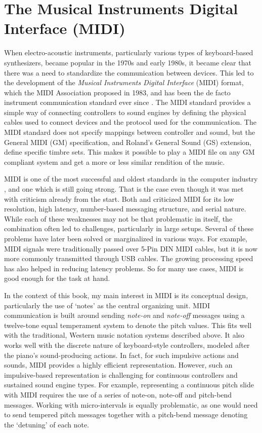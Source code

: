 \section{The Musical Instruments Digital Interface (MIDI)}\label{sect:midi}

When electro-acoustic instruments, particularly various types of keyboard-based synthesizers, became popular in the 1970s and early 1980s, it became clear that there was a need to standardize the communication between devices. This led to the development of the \emph{Musical Instruments Digital Interface} (MIDI) format, which the MIDI Association proposed in 1983, and has been the de facto instrument communication standard ever since \citep{jungleib_general_1996}. The MIDI standard provides a simple way of connecting controllers to sound engines by defining the physical cables used to connect devices and the protocol used for the communication. The MIDI standard does not specify mappings between controller and sound, but the General MIDI (GM) specification, and Roland's General Sound (GS) extension, define specific timbre sets. This makes it possible to play a MIDI file on any GM compliant system and get a more or less similar rendition of the music.

MIDI is one of the most successful and oldest standards in the computer industry \citep{rothstein_midi_1992}, and one which is still going strong. That is the case even though it was met with criticism already from the start. Both \citet{loy_musicians_1985} and \citet{moore_dysfunctions_1988} criticized MIDI for its low resolution, high latency, number-based messaging structure, and serial nature. While each of these weaknesses may not be that problematic in itself, the combination often led to challenges, particularly in large setups. Several of these problems have later been solved or marginalized in various ways. For example, MIDI signals were traditionally passed over 5-Pin DIN MIDI cables, but it is now more commonly transmitted through USB cables. The growing processing speed has also helped in reducing latency problems. So for many use cases, MIDI is good enough for the task at hand.

In the context of this book, my main interest in MIDI is its conceptual design, particularly the use of `notes' as the central organizing unit. MIDI communication is built around sending \emph{note-on} and \emph{note-off} messages using a twelve-tone equal temperament system to denote the pitch values. This fits well with the traditional, Western music notation systems described above. It also works well with the discrete nature of keyboard-style controllers, modeled after the piano's sound-producing actions. In fact, for such impulsive actions and sounds, MIDI provides a highly efficient representation. However, such an impulsive-based representation is challenging for continuous controllers and sustained sound engine types. For example, representing a continuous pitch slide with MIDI requires the use of a series of note-on, note-off and pitch-bend messages. Working with micro-intervals is equally problematic, as one would need to send tempered pitch messages together with a pitch-bend message denoting the `detuning' of each note.

